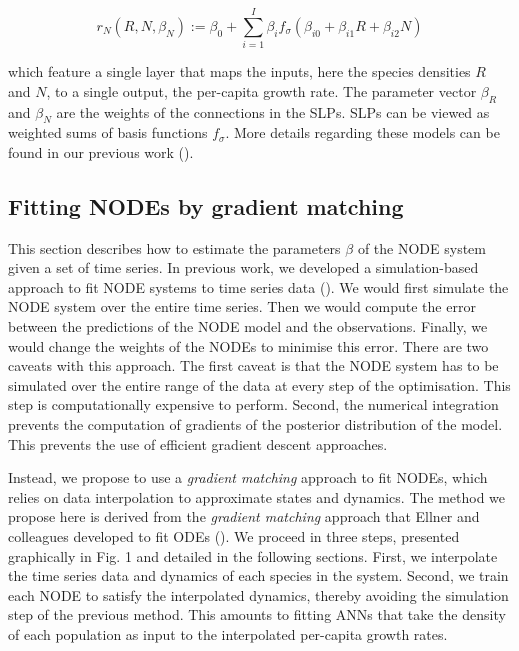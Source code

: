 \documentclass[11pt, oneside]{article}
\begin{document}
\vspace{-0.5cm}
\begin{equation}
    r_N(R, N, \beta_N) := \beta_0 + \sum_{i=1}^{I} \beta_{i} f_{\sigma} \left( \beta_{i0} + \beta_{i1} R + \beta_{i2} N \right) 
\end{equation}

which feature a single layer that  maps the inputs, here the species densities $R$ and $N$, to a single output, the per-capita growth rate.
The parameter vector $\beta_R$ and $\beta_N$ are the weights of the connections in the SLPs.
SLPs can be viewed as weighted sums of basis functions $f_\sigma$.
More details regarding these models can be found in our previous work (\cite{Bonnaffe2021a}).

\subsection{Fitting NODEs by gradient matching}

This section describes how to estimate the parameters $\beta$ of the NODE system given a set of time series.
In previous work, we developed a simulation-based approach to fit NODE systems to time series data (\cite{Bonnaffe2021a}).
We would first simulate the NODE system over the entire time series.
Then we would compute the error between the predictions of the NODE model and the observations. 
Finally, we would change the weights of the NODEs to minimise this error. 
There are two caveats with this approach.
The first caveat is that the NODE system has to be simulated over the entire range of the data at every step of the optimisation.
This step is computationally expensive to perform.
Second, the numerical integration prevents the computation of gradients of the posterior distribution of the model.
This prevents the use of efficient gradient descent approaches.

Instead, we propose to use a \textit{gradient matching} approach to fit NODEs, which relies on data interpolation to approximate states and dynamics.
The method we propose here is derived from the \textit{gradient matching} approach that Ellner and colleagues developed to fit ODEs (\cite{Ellner2002, Wu2005}).
We proceed in three steps, presented graphically in Fig. 1 and detailed in the following sections. 
First, we interpolate the time series data and dynamics of each species in the system. 
Second, we train each NODE to satisfy the interpolated dynamics, thereby avoiding the simulation step of the previous method. 
This amounts to fitting ANNs that take the density of each population as input to the interpolated per-capita growth rates.
\end{document}
